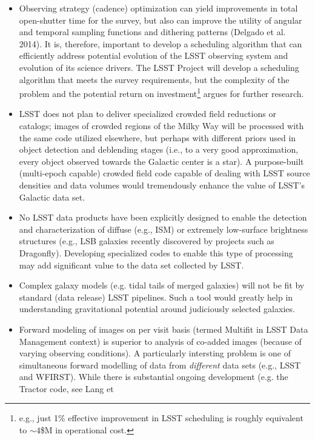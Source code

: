 \documentclass{iau}
\begin{document}
\begin{itemize}
\item Observing strategy (cadence) optimization can yield improvements
  in total open-shutter time for the survey, but also can improve the
  utility of angular and temporal sampling functions and dithering
  patterns (Delgado et al. 2014). It is, therefore, important to
  develop a scheduling algorithm that can efficiently address
  potential evolution of the LSST observing system and evolution of
  its science drivers. The LSST Project will develop a scheduling algorithm
  that meets the survey requirements, but the complexity of the problem and
  the potential return on investment\footnote{e.g., just 1\% effective improvement
  in LSST scheduling is roughly equivalent to $\sim4$\$M in operational cost.}
  argues for further research.
\item LSST does not plan to deliver specialized crowded field reductions
  or catalogs; images of crowded regions of the Milky Way will be
  processed with the same code utilized elsewhere, but perhaps with
  different priors used in object detection and deblending stages (i.e., to
  a very good approximation, every object observed towards the Galactic
  center is a star). A purpose-built (multi-epoch capable) crowded field
  code capable of dealing with LSST source densities and data volumes
  would tremendously enhance the value of LSST's Galactic data set.
\item No LSST data products have been explicitly designed to enable the
  detection and characterization of diffuse (e.g., ISM) or extremely
  low-surface brightness structures (e.g., LSB galaxies recently discovered
  by projects such as Dragonfly). Developing specialized codes to enable this
  type of processing may add significant value to the data set
  collected by LSST.
\item Complex galaxy models (e.g. tidal tails of merged galaxies) will
  not be fit by standard (data release) LSST pipelines. Such a tool
  would greatly help in understanding gravitational potential around
  judiciously selected galaxies.
\item Forward modeling of images on per visit basis (termed Multifit
  in LSST Data Management context) is superior to analysis of co-added
  images (because of varying observing conditions).  A particularly
  intersting problem is one of simultaneous forward modelling of data
  from {\em different} data sets (e.g., LSST and WFIRST). While there is
  substantial ongoing development (e.g. the Tractor code, see Lang et

\end{itemize}
\end{document}

